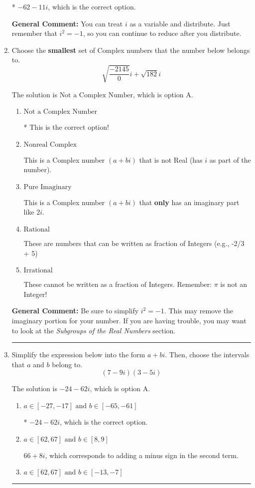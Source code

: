 \documentclass{extbook}[14pt]
\newcommand{\litem}[1]{\item #1

\rule{\textwidth}{0.4pt}}
\begin{document}
\begin{enumerate}
{\begin{enumerate}[label=\Alph*.]
* $-62 - 11 i$, which is the correct option.
\end{enumerate}

\textbf{General Comment:} You can treat $i$ as a variable and distribute. Just remember that $i^2=-1$, so you can continue to reduce after you distribute.
}
\litem{
Choose the \textbf{smallest} set of Complex numbers that the number below belongs to.
\[ \sqrt{\frac{-2145}{0}} i+\sqrt{182}i \]

The solution is \( \text{Not a Complex Number} \), which is option A.\begin{enumerate}[label=\Alph*.]
\item \( \text{Not a Complex Number} \)

* This is the correct option!
\item \( \text{Nonreal Complex} \)

This is a Complex number $(a+bi)$ that is not Real (has $i$ as part of the number).
\item \( \text{Pure Imaginary} \)

This is a Complex number $(a+bi)$ that \textbf{only} has an imaginary part like $2i$.
\item \( \text{Rational} \)

These are numbers that can be written as fraction of Integers (e.g., -2/3 + 5)
\item \( \text{Irrational} \)

These cannot be written as a fraction of Integers. Remember: $\pi$ is not an Integer!
\end{enumerate}

\textbf{General Comment:} Be sure to simplify $i^2 = -1$. This may remove the imaginary portion for your number. If you are having trouble, you may want to look at the \textit{Subgroups of the Real Numbers} section.
}
\litem{
Simplify the expression below into the form $a+bi$. Then, choose the intervals that $a$ and $b$ belong to.
\[ (7 - 9 i)(3 - 5 i) \]

The solution is \( -24 - 62 i \), which is option A.\begin{enumerate}[label=\Alph*.]
\item \( a \in [-27, -17] \text{ and } b \in [-65, -61] \)

* $-24 - 62 i$, which is the correct option.
\item \( a \in [62, 67] \text{ and } b \in [8, 9] \)

 $66 + 8 i$, which corresponds to adding a minus sign in the second term.
\item \( a \in [62, 67] \text{ and } b \in [-13, -7] \)


\end{enumerate}}
\end{enumerate}
\end{document}
